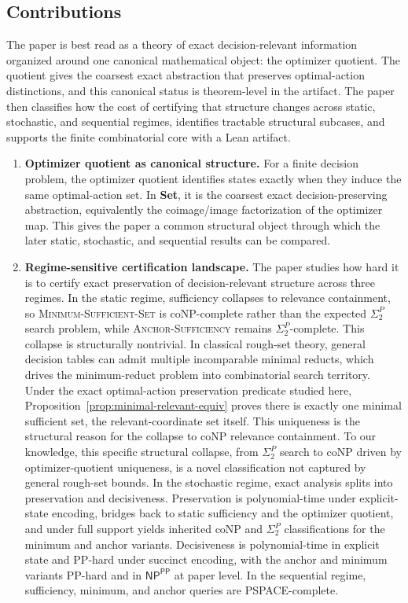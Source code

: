 \subsection{Contributions}

The paper is best read as a theory of exact decision-relevant information organized around one canonical mathematical object: the optimizer quotient. The quotient gives the coarsest exact abstraction that preserves optimal-action distinctions, and this canonical status is theorem-level in the artifact. The paper then classifies how the cost of certifying that structure changes across static, stochastic, and sequential regimes, identifies tractable structural subcases, and supports the finite combinatorial core with a Lean artifact.

\begin{enumerate}
\item \textbf{Optimizer quotient as canonical structure.} For a finite decision problem, the optimizer quotient identifies states exactly when they induce the same optimal-action set. In \textbf{Set}, it is the coarsest exact decision-preserving abstraction, equivalently the coimage/image factorization of the optimizer map. This gives the paper a common structural object through which the later static, stochastic, and sequential results can be compared.

\item \textbf{Regime-sensitive certification landscape.} The paper studies how hard it is to certify exact preservation of decision-relevant structure across three regimes. In the static regime, sufficiency collapses to relevance containment, so \textsc{Minimum-Sufficient-Set} is coNP-complete rather than the expected $\Sigma_2^P$ search problem, while \textsc{Anchor-Sufficiency} remains $\Sigma_2^P$-complete. This collapse is structurally nontrivial. In classical rough-set theory, general decision tables can admit multiple incomparable minimal reducts, which drives the minimum-reduct problem into combinatorial search territory. Under the exact optimal-action preservation predicate studied here, Proposition~\ref{prop:minimal-relevant-equiv} proves there is exactly one minimal sufficient set, the relevant-coordinate set itself. This uniqueness is the structural reason for the collapse to coNP relevance containment. To our knowledge, this specific structural collapse, from $\Sigma_2^P$ search to coNP driven by optimizer-quotient uniqueness, is a novel classification not captured by general rough-set bounds. In the stochastic regime, exact analysis splits into preservation and decisiveness. Preservation is polynomial-time under explicit-state encoding, bridges back to static sufficiency and the optimizer quotient, and under full support yields inherited coNP and $\Sigma_2^P$ classifications for the minimum and anchor variants. Decisiveness is polynomial-time in explicit state and PP-hard under succinct encoding, with the anchor and minimum variants PP-hard and in $\textsf{NP}^{\textsf{PP}}$ at paper level. In the sequential regime, sufficiency, minimum, and anchor queries are PSPACE-complete.


\end{enumerate}
